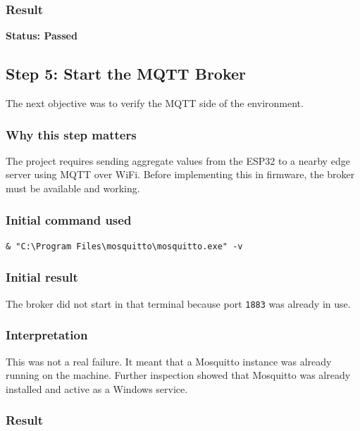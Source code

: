 \documentclass[12pt,a4paper]{article}
\begin{document}
\subsubsection*{Result}

\textbf{Status: Passed}

\subsection{Step 5: Start the MQTT Broker}

The next objective was to verify the MQTT side of the environment.

\subsubsection*{Why this step matters}

The project requires sending aggregate values from the ESP32 to a nearby edge
server using MQTT over WiFi. Before implementing this in firmware, the broker
must be available and working.

\subsubsection*{Initial command used}

\begin{lstlisting}
& "C:\Program Files\mosquitto\mosquitto.exe" -v
\end{lstlisting}

\subsubsection*{Initial result}

The broker did not start in that terminal because port \texttt{1883} was
already in use.

\subsubsection*{Interpretation}

This was not a real failure. It meant that a Mosquitto instance was already
running on the machine. Further inspection showed that Mosquitto was already
installed and active as a Windows service.

\subsubsection*{Result}
\end{document}
